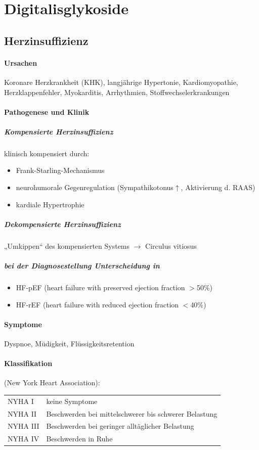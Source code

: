 \documentclass[10pt,a4paper]{report}
\begin{document}
\chapter{Digitalisglykoside}
\section{Herzinsuffizienz}
\subsubsection{Ursachen} Koronare Herzkrankheit (KHK), langjährige Hypertonie, Kardiomyopathie, Herzklappenfehler, Myokarditis, Arrhythmien, Stoffwechselerkrankungen
\subsubsection{Pathogenese und Klinik}
\paragraph{Kompensierte Herzinsuffizienz} klinisch kompensiert durch:	
\begin{itemize}
	\item Frank-Starling-Mechanismus
	\item neurohumorale Gegenregulation (Sympathikotonus$\uparrow$, Aktivierung d. RAAS)
	\item kardiale Hypertrophie
\end{itemize}
\paragraph{Dekompensierte Herzinsuffizienz}
	„Umkippen“ des kompensierten Systems $\rightarrow$ Circulus vitiosus
\paragraph{bei der Diagnosestellung Unterscheidung in}
\begin{itemize}
	\item HF-pEF (heart failure with preserved ejection fraction $>$50\%)
	\item HF-rEF (heart failure with reduced ejection fraction $<$40\%)
\end{itemize} 
\subsubsection{Symptome}Dyspnoe, Müdigkeit, Flüssigkeitsretention
\subsubsection{Klassifikation}(New York Heart Association):\\
\begin{tabularx}{\textwidth}{XX}
NYHA I&keine Symptome\\
NYHA II&Beschwerden bei mittelschwerer bis schwerer Belastung\\
NYHA III&Beschwerden bei geringer alltäglicher Belastung\\
NYHA IV&Beschwerden in Ruhe\\
\end{tabularx}
\end{document}
